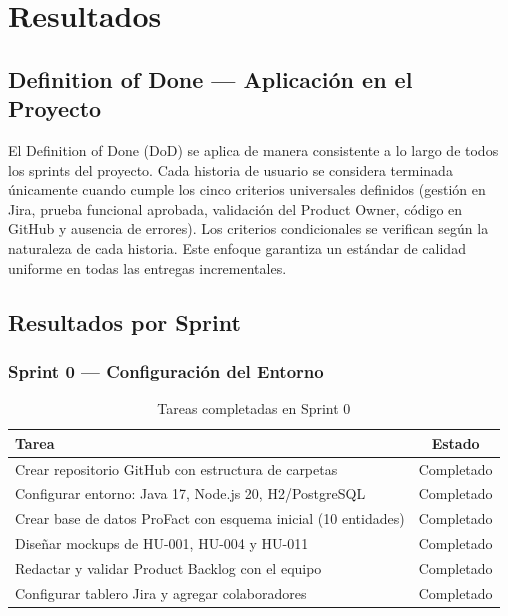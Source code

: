 \documentclass[12pt, letterpaper]{report}
\begin{document}
\chapter{Resultados}

\section{Definition of Done --- Aplicación en el Proyecto}

El Definition of Done (DoD) se aplica de manera consistente a lo largo de todos los sprints del proyecto. Cada historia de usuario se considera terminada únicamente cuando cumple los cinco criterios universales definidos (gestión en Jira, prueba funcional aprobada, validación del Product Owner, código en GitHub y ausencia de errores). Los criterios condicionales se verifican según la naturaleza de cada historia. Este enfoque garantiza un estándar de calidad uniforme en todas las entregas incrementales.

\section{Resultados por Sprint}

\subsection{Sprint 0 --- Configuración del Entorno}

\begin{table}[H]
\centering
\caption{Tareas completadas en Sprint 0}
\renewcommand{\arraystretch}{1.3}
\begin{tabularx}{\textwidth}{|X|c|}
\hline
\textbf{Tarea} & \textbf{Estado} \\ \hline
Crear repositorio GitHub con estructura de carpetas & Completado \\ \hline
Configurar entorno: Java 17, Node.js 20, H2/PostgreSQL & Completado \\ \hline
Crear base de datos ProFact con esquema inicial (10 entidades) & Completado \\ \hline
Diseñar mockups de HU-001, HU-004 y HU-011 & Completado \\ \hline
Redactar y validar Product Backlog con el equipo & Completado \\ \hline
Configurar tablero Jira y agregar colaboradores & Completado \\ \hline
\end{tabularx}
\end{table}
\end{document}
